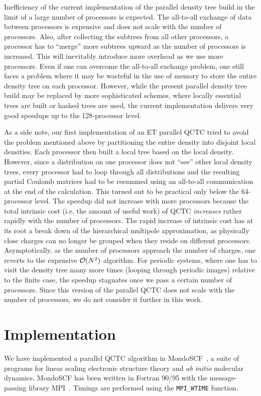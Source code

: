 \commentoutA{\documentclass[prl,aps,twocolumn,twocolumngrid,superbib]{revtex4}}
\begin{document}
Inefficiency of the current implementation of the parallel density
tree build in the limit of a large number of processors is expected.
The all-to-all exchange of data between processors is expensive and
does not scale with the number of processors. Also, after collecting
the subtrees from all other processors, a processor has to ``merge''
more subtrees upward as the number of processors is increased. This
will inevitably introduce more overhead as we use more processors.
Even if one can overcome the all-to-all exchange problem, one still
faces a problem where it may be wasteful in the use of memory to store
the entire density tree on each processor.  However, while the present
parallel density tree build may be replaced by more sophisticated
schemes, where locally essential trees are built\cite{MWarren92} or
hashed trees are used\cite{MWarren93,MWarren95b}, the current
implementation delivers very good speedups up to the 128-processor
level.

As a side note, our first implementation of an ET parallel QCTC tried
to avoid the problem mentioned above by partitioning the entire
density into disjoint local densities. Each processor then built a
local tree based on the local density. However, since a distribution
on one processor does not ``see'' other local density trees, every
processor had to loop through all distributions and the resulting
partial Coulomb matrices had to be resummed using an all-to-all
communication at the end of the calculation. This turned out to be
practical only below the 64-processor level. The speedup did not
increase with more processors because the total intrinsic cost
(i.e. the amount of useful work) of QCTC {\it increases} rather
rapidly with the number of processors. The rapid increase of intrinsic
cost has at its root a break down of the hierarchical multipole
approximation, as physically close charges can no longer be grouped
when they reside on different processors.  Asymptotically, as the
number of processors approach the number of charges, one reverts to
the expensive ${\cal O}(N^2)$ algorithm.  For periodic systems, where
one has to visit the density tree many more times (looping through
periodic images) relative to the finite case, the speedup stagnates
once we pass a certain number of processors. Since this version of the
parallel QCTC does not scale with the number of processors, we do not
consider it further in this work.

\section{Implementation}
\label{sec:implementation}
We have implemented a parallel QCTC algorithm in {\sc
MondoSCF}~\cite{MondoSCF}, a suite of programs for linear scaling
electronic structure theory and {\it ab initio}\/ molecular dynamics.
{\sc MondoSCF} has been written in Fortran 90/95 with the
message-passing library MPI~\cite{mpi}.  Timings are performed using
the {\tt MPI\_WTIME} function.
\end{document}
